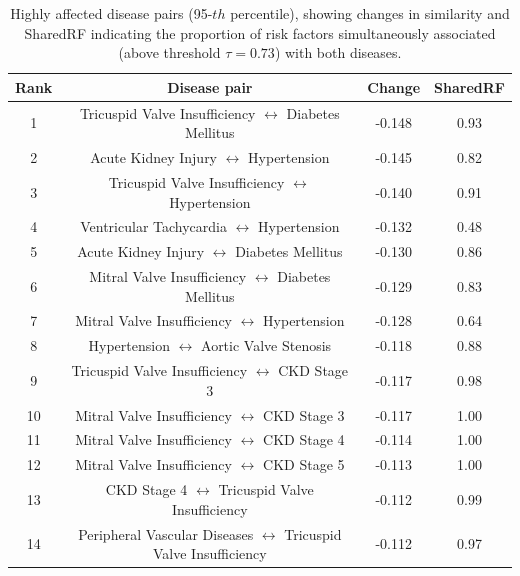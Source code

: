 \begin{table}[h]
\centering
\small
\begin{tabular}{cccc}
\hline
\textbf{Rank} & \textbf{Disease pair} & \textbf{Change} & \textbf{SharedRF} \\
\hline
1 & Tricuspid Valve Insufficiency $\leftrightarrow$ Diabetes Mellitus & -0.148 & 0.93 \\
2 & Acute Kidney Injury $\leftrightarrow$ Hypertension & -0.145 & 0.82 \\
3 & Tricuspid Valve Insufficiency $\leftrightarrow$ Hypertension & -0.140 & 0.91 \\
4 & Ventricular Tachycardia $\leftrightarrow$ Hypertension & -0.132 & 0.48 \\
5 & Acute Kidney Injury $\leftrightarrow$ Diabetes Mellitus & -0.130 & 0.86 \\
6 & Mitral Valve Insufficiency $\leftrightarrow$ Diabetes Mellitus & -0.129 & 0.83 \\
7 & Mitral Valve Insufficiency $\leftrightarrow$ Hypertension & -0.128 & 0.64 \\
8 & Hypertension $\leftrightarrow$ Aortic Valve Stenosis & -0.118 & 0.88 \\
9 & Tricuspid Valve Insufficiency $\leftrightarrow$ CKD Stage 3 & -0.117 & 0.98 \\
10 & Mitral Valve Insufficiency $\leftrightarrow$ CKD Stage 3 & -0.117 & 1.00 \\
11 & Mitral Valve Insufficiency $\leftrightarrow$ CKD Stage 4 & -0.114 & 1.00 \\
12 & Mitral Valve Insufficiency $\leftrightarrow$ CKD Stage 5 & -0.113 & 1.00 \\
13 & CKD Stage 4 $\leftrightarrow$ Tricuspid Valve Insufficiency & -0.112 & 0.99 \\
14 & Peripheral Vascular Diseases $\leftrightarrow$ Tricuspid Valve Insufficiency & -0.112 & 0.97 \\
\hline
\end{tabular}
\caption{Highly affected disease pairs (95-$th$ percentile), showing changes in similarity and SharedRF indicating the proportion of risk factors simultaneously associated (above threshold $\tau = 0.73$) with both diseases.}
\label{tab:top_affected_pairs_shared}
\end{table}

